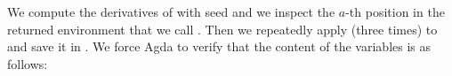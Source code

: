 \begin{code}%
%
\>[4]\AgdaSpace{}%
\AgdaSymbol{=}\AgdaSpace{}%
\AgdaSpace{}%
%
\>[13]\AgdaSpace{}%
\AgdaSymbol{(}\AgdaSpace{}%
\AgdaSymbol{)}%
\>[28]%
\>[31]\AgdaSpace{}%
\AgdaSymbol{(}\AgdaSpace{}%
\AgdaSymbol{)}%
\>[43]%
\>[46]\AgdaSpace{}%
\AgdaSymbol{(}\AgdaSpace{}%
\AgdaSymbol{);}\<%
\\
%
\>[13]\AgdaSpace{}%
\AgdaSymbol{=}\AgdaSpace{}%
\AgdaSpace{}%
%
\>[28]\AgdaSymbol{;}%
\>[31]\AgdaSpace{}%
\AgdaSymbol{=}\AgdaSpace{}%
\AgdaSpace{}%
%
\>[43]\AgdaSymbol{;}%
\>[46]%
\>[49]\AgdaSymbol{=}\AgdaSpace{}%
\AgdaSpace{}%
\<%
\end{code}
\begin{code}[hide]%
%
\>[4]%
\>[11]\AgdaSymbol{=}\AgdaSpace{}%
\AgdaSpace{}%
\AgdaSymbol{\{}\AgdaSymbol{\}}\AgdaSpace{}%
\AgdaSymbol{(}\AgdaSpace{}%
\AgdaSymbol{\{}\AgdaSymbol{\}}\AgdaSpace{}%
\AgdaSymbol{(}\AgdaSpace{}%
\AgdaSpace{}%
\AgdaSymbol{)}\AgdaSpace{}%
\AgdaSpace{}%
\AgdaSymbol{(}\AgdaSpace{}%
\AgdaSymbol{\{}\AgdaSymbol{\}))}\AgdaSpace{}%
\<%
\\
%
\>[4]%
\>[11]\AgdaSymbol{=}\AgdaSpace{}%
\AgdaSpace{}%
\AgdaSpace{}%
\<%
\end{code}
We compute the derivatives of  with seed  and we inspect
the $a$-th position in the returned environment that we call .  Then we repeatedly
apply  (three times) to  and save it in .  We force Agda to
verify that the content of the variables is as follows:
